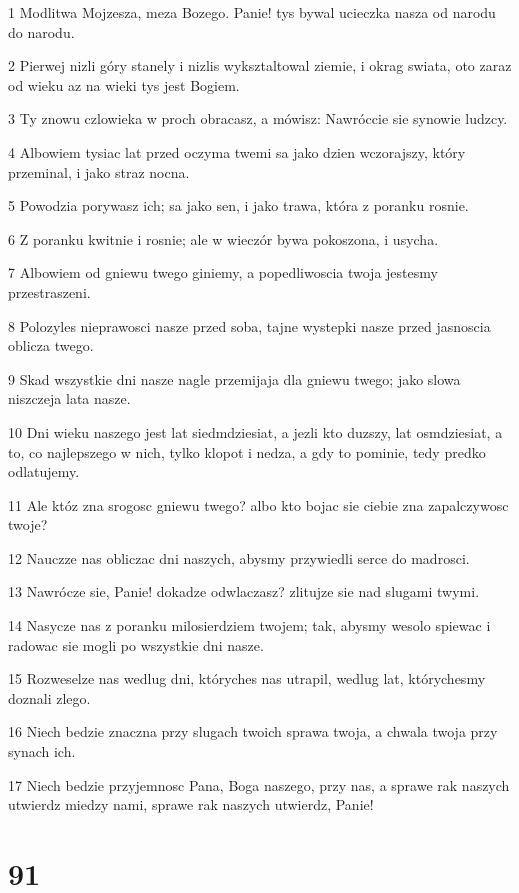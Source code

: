 \par 1 Modlitwa Mojzesza, meza Bozego. Panie! tys bywal ucieczka nasza od narodu do narodu.
\par 2 Pierwej nizli góry stanely i nizlis wyksztaltowal ziemie, i okrag swiata, oto zaraz od wieku az na wieki tys jest Bogiem.
\par 3 Ty znowu czlowieka w proch obracasz, a mówisz: Nawróccie sie synowie ludzcy.
\par 4 Albowiem tysiac lat przed oczyma twemi sa jako dzien wczorajszy, który przeminal, i jako straz nocna.
\par 5 Powodzia porywasz ich; sa jako sen, i jako trawa, która z poranku rosnie.
\par 6 Z poranku kwitnie i rosnie; ale w wieczór bywa pokoszona, i usycha.
\par 7 Albowiem od gniewu twego giniemy, a popedliwoscia twoja jestesmy przestraszeni.
\par 8 Polozyles nieprawosci nasze przed soba, tajne wystepki nasze przed jasnoscia oblicza twego.
\par 9 Skad wszystkie dni nasze nagle przemijaja dla gniewu twego; jako slowa niszczeja lata nasze.
\par 10 Dni wieku naszego jest lat siedmdziesiat, a jezli kto duzszy, lat osmdziesiat, a to, co najlepszego w nich, tylko klopot i nedza, a gdy to pominie, tedy predko odlatujemy.
\par 11 Ale któz zna srogosc gniewu twego? albo kto bojac sie ciebie zna zapalczywosc twoje?
\par 12 Nauczze nas obliczac dni naszych, abysmy przywiedli serce do madrosci.
\par 13 Nawrócze sie, Panie! dokadze odwlaczasz? zlitujze sie nad slugami twymi.
\par 14 Nasycze nas z poranku milosierdziem twojem; tak, abysmy wesolo spiewac i radowac sie mogli po wszystkie dni nasze.
\par 15 Rozweselze nas wedlug dni, któryches nas utrapil, wedlug lat, którychesmy doznali zlego.
\par 16 Niech bedzie znaczna przy slugach twoich sprawa twoja, a chwala twoja przy synach ich.
\par 17 Niech bedzie przyjemnosc Pana, Boga naszego, przy nas, a sprawe rak naszych utwierdz miedzy nami, sprawe rak naszych utwierdz, Panie!

\chapter{91}

